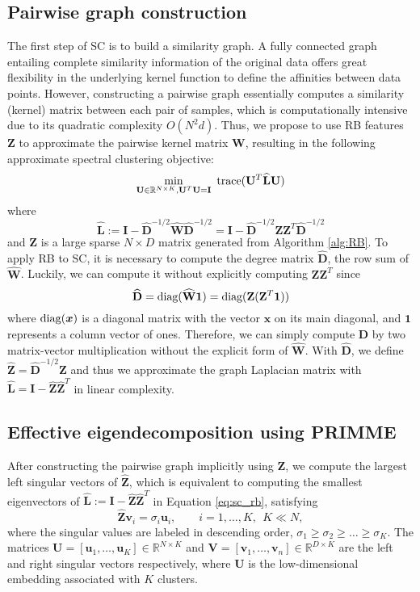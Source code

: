 \documentclass[sigconf]{acmart}
\newcommand{\R}{\mathbb{R}}
\newcommand{\1}{\boldsymbol{1}}
\newcommand{\bx}{\boldsymbol{x}}
\newcommand{\bv}{\boldsymbol{v}}
\newcommand{\bu}{\boldsymbol{u}}
\newcommand{\bW}{\mathbf{W}}
\newcommand{\bD}{\mathbf{D}}
\newcommand{\bL}{\mathbf{L}}
\newcommand{\bZ}{\mathbf{Z}}
\newcommand{\bU}{\mathbf{U}}
\newcommand{\bV}{\mathbf{V}}
\newcommand{\bI}{\mathbf{I}}
\newcommand{\tr}{\textnormal{trace}}
\newcommand{\0}{\boldsymbol{0}}
\begin{document}
\subsection{Pairwise graph construction}
The first step of SC is to build a similarity graph. A fully connected graph entailing complete similarity information of the original data offers great flexibility in the underlying kernel function to define the affinities between data points. However, constructing a pairwise graph essentially computes a similarity (kernel) matrix between each pair of samples, which is computationally intensive due to its quadratic complexity $O(N^2d)$. Thus, we propose to use RB features $\bZ$ to approximate the pairwise kernel matrix $\bW$, resulting in the following approximate spectral clustering objective:
\begin{equation}\label{eq:sc_rb}
\begin{aligned}
\min_{\bU \in \R^{N \times K},\bU^T \bU=\bI}~\tr(\bU^T\widehat{\bL}\bU)
\end{aligned}
\end{equation}
where 
$$
\widehat{\bL}:=\bI-\widehat{\bD}^{-1/2}\widehat{\bW}\widehat{\bD}^{-1/2}=\bI-\widehat{\bD}^{-1/2}\bZ\bZ^T\widehat{\bD}^{-1/2}
$$
and $\bZ$ is a large sparse $N\times D$ matrix generated from Algorithm \ref{alg:RB}. To apply RB to SC, it is necessary to compute the degree matrix $\widehat{\bD}$, the row sum of $\widehat{\bW}$. Luckily, we can compute it without explicitly computing $\bZ\bZ^T$ since
\begin{equation}\label{eq:sc_rb_computeD}
    \widehat{\bD} = \textnormal{diag}(\widehat{\bW}\1) = \textnormal{diag}(\bZ (\bZ^T \1))
\end{equation} 
where $\textnormal{diag}(\bx)$ is a diagonal matrix with the vector $\bx$ on its main diagonal, and $\1$ represents a column vector of ones. Therefore, we can simply compute $\widehat{\bD}$ by two matrix-vector multiplication without the explicit form of $\widehat{\bW}$. With $\widehat{\bD}$, we define $\widehat{\bZ} = \widehat{\bD}^{-1/2}\bZ$ and thus we approximate the graph Laplacian matrix with $\widehat{\bL} = \bI -  \widehat{\bZ}\widehat{\bZ}^T$ in linear complexity.  

\subsection{Effective eigendecomposition using PRIMME}
After constructing the pairwise graph implicitly using $\bZ$, we compute the largest left singular vectors of $\widehat{\bZ}$, which is equivalent to computing the smallest eigenvectors of $\widehat{\bL} := \bI - \widehat{\bZ}\widehat{\bZ}^T$ in Equation \eqref{eq:sc_rb}, satisfying 
\begin{equation}
\widehat{\bZ}\bv_i = \sigma_i \bu_i, \quad \quad i = 1, \ldots, K, \ \ K \ll N ,
\end{equation}
where the singular values are labeled in descending order, $\sigma_1 \geq \sigma_2 \geq \ldots \geq \sigma_K$. The matrices $ \bU = [\bu_{1},\ldots , \bu_{K}] \in \mathbb{R}^{N \times K}$ and $ \bV = [\bv_{1},\ldots , \bv_{n}] \in \mathbb{R}^{D \times K}$ are the left and right singular vectors respectively, where $\bU$ is the low-dimensional embedding associated with $K$ clusters. 
\end{document}
